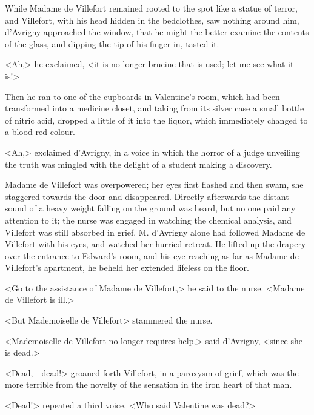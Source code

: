  While Madame de Villefort remained rooted to the spot like a statue of terror, and Villefort, with his head hidden in the bedclothes, saw nothing around him, d'Avrigny approached the window, that he might the better examine the contents of the glass, and dipping the tip of his finger in, tasted it. 

 <Ah,> he exclaimed, <it is no longer brucine that is used; let me see what it is!> 

 Then he ran to one of the cupboards in Valentine's room, which had been transformed into a medicine closet, and taking from its silver case a small bottle of nitric acid, dropped a little of it into the liquor, which immediately changed to a blood-red colour. 

 <Ah,> exclaimed d'Avrigny, in a voice in which the horror of a judge unveiling the truth was mingled with the delight of a student making a discovery. 

 Madame de Villefort was overpowered; her eyes first flashed and then swam, she staggered towards the door and disappeared. Directly afterwards the distant sound of a heavy weight falling on the ground was heard, but no one paid any attention to it; the nurse was engaged in watching the chemical analysis, and Villefort was still absorbed in grief. M. d'Avrigny alone had followed Madame de Villefort with his eyes, and watched her hurried retreat. He lifted up the drapery over the entrance to Edward's room, and his eye reaching as far as Madame de Villefort's apartment, he beheld her extended lifeless on the floor. 

 <Go to the assistance of Madame de Villefort,> he said to the nurse. <Madame de Villefort is ill.>

<But Mademoiselle de Villefort\longdash> stammered the nurse. 

 <Mademoiselle de Villefort no longer requires help,> said d'Avrigny, <since she is dead.> 

 <Dead,—dead!> groaned forth Villefort, in a paroxysm of grief, which was the more terrible from the novelty of the sensation in the iron heart of that man. 

 <Dead!> repeated a third voice. <Who said Valentine was dead?> 

